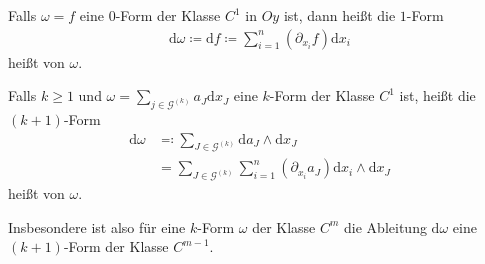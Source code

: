 \begin{theorem}[Differentiation] \label{8.3}
  \begin{enum-arab}
  \item
    Falls $\omega = f$ eine $0$-Form der Klasse $C^1$ in $Oy$ ist, dann heißt die $1$-Form
    \begin{align*}
      \mathrm d \omega \coloneq \mathrm df \coloneq \sum_{i=1}^n (\partial_{x_i} f) \mathrm d x_i
    \end{align*}
    heißt  von $\omega$.
  \item
    Falls $k \ge 1$ und $\omega = \sum_{j \in \mathcal{G}^{(k)}} a_J \mathrm d x_J$ eine $k$-Form der Klasse $C^1$ ist, heißt die $(k+1)$-Form
    \begin{align*}
      \mathrm d \omega &\eqcolon \sum_{J \in \mathcal{G}^{(k)}} \mathrm d a_J \wedge \mathrm d x_J \\
      &= \sum_{J \in \mathcal{G}^{(k)}} \sum_{i=1}^n (\partial_{x_i} a_J) \mathrm{d} x_i \wedge \mathrm d x_J
    \end{align*}
    heißt  von $\omega$.
  \end{enum-arab}
  Insbesondere ist also für eine $k$-Form $\omega$ der Klasse $C^m$ die Ableitung $\mathrm d \omega$ eine $(k+1)$-Form der Klasse $C^{m-1}$.
\end{theorem}

